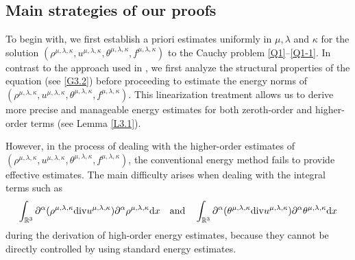 \documentclass[reqno,11pt]{amsart}
\theoremstyle{plain}
\numberwithin{equation}{section}
\begin{document}
\subsection{Main strategies of our  proofs}


To begin with, we first establish a priori estimates 
 uniformly in  $\mu,\lambda$ and $\kappa$  for the solution $(\rho^{\mu,\lambda,\kappa}, 
 u^{\mu,\lambda,\kappa}, \theta^{\mu,\lambda,\kappa}, f^{\mu,\lambda,\kappa})$ 
to the Cauchy problem   \eqref{Q1}--\eqref{Q1-1}. In contrast to 
 the approach used in \cite{Mu-Wang-20}, we first analyze the structural properties
  of the equation (see \eqref{G3.2}) before proceeding to estimate the energy norms of
   $(\rho^{\mu,\lambda,\kappa}, u^{\mu,\lambda,\kappa}, \theta^{\mu,\lambda,\kappa},
    f^{\mu,\lambda,\kappa})$.  This linearization treatment allows us to derive 
more precise and manageable energy estimates for both zeroth-order and higher-order
 terms (see Lemma \ref{L3.1}). 

 
However, in the process of dealing with the higher-order estimates 
of $(\rho^{\mu,\lambda,\kappa}, u^{\mu,\lambda,\kappa}, \theta^{\mu,\lambda,\kappa},
 f^{\mu,\lambda,\kappa})$, the conventional energy method fails to provide effective estimates. 
 The main difficulty arises when dealing with the integral terms such as 
 \begin{align*}\int_{\mathbb{R}^3}\partial^\alpha(\rho^{\mu,\lambda,\kappa} 
 {\rm div}u^{\mu,\lambda,\kappa})\partial^\alpha\rho^{\mu,\lambda,\kappa}
 {\rm d}x \quad \text{and}\quad \int_{\mathbb{R}^3}\partial^\alpha(\theta^{\mu,\lambda,\kappa} 
 {\rm div}u^{\mu,\lambda,\kappa})\partial^\alpha\theta^{\mu,\lambda,\kappa}{\rm d}x\end{align*} 
 during the derivation
 of high-order energy estimates, because they cannot be directly controlled  
  by using standard energy estimates. 
 
\end{document}
